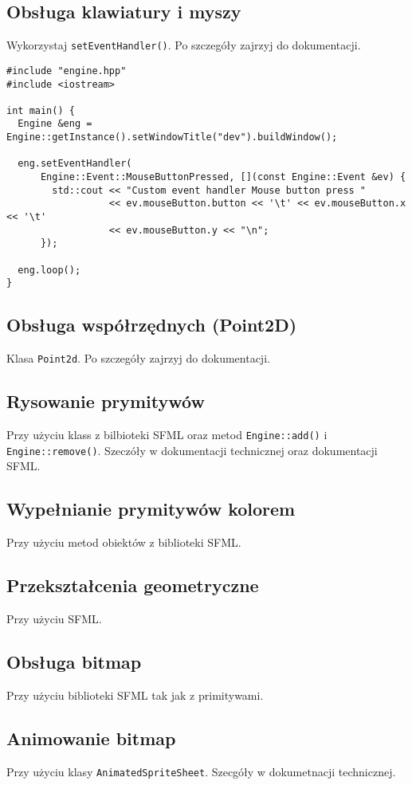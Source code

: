 \documentclass[11pt]{article}
\begin{document}
\subsection{Obsługa klawiatury i myszy}
\label{sec:org43269a6}
Wykorzystaj \texttt{setEventHandler()}. Po szczegóły zajrzyj do dokumentacji.

\begin{verbatim}
#include "engine.hpp"
#include <iostream>

int main() {
  Engine &eng = Engine::getInstance().setWindowTitle("dev").buildWindow();

  eng.setEventHandler(
      Engine::Event::MouseButtonPressed, [](const Engine::Event &ev) {
        std::cout << "Custom event handler Mouse button press "
                  << ev.mouseButton.button << '\t' << ev.mouseButton.x << '\t'
                  << ev.mouseButton.y << "\n";
      });

  eng.loop();
}
\end{verbatim}
\subsection{Obsługa współrzędnych (Point2D)}
\label{sec:org9666499}
Klasa \texttt{Point2d}. Po szczegóły zajrzyj do dokumentacji.
\subsection{Rysowanie prymitywów}
\label{sec:orgdeb4bf1}
Przy użyciu klass z bilbioteki SFML oraz metod \texttt{Engine::add()} i \texttt{Engine::remove()}.
Szeczóły w dokumentacji technicznej oraz dokumentacji SFML.
\subsection{Wypełnianie prymitywów kolorem}
\label{sec:orgfabc6a9}
Przy użyciu metod obiektów z biblioteki SFML.
\subsection{Przekształcenia geometryczne}
\label{sec:org52973b8}
Przy użyciu SFML.
\subsection{Obsługa bitmap}
\label{sec:org998f764}
Przy użyciu biblioteki SFML tak jak z primitywami.
\subsection{Animowanie bitmap}
\label{sec:orgd573061}
Przy użyciu klasy \texttt{AnimatedSpriteSheet}. Szecgóły w dokumetnacji technicznej.
\end{document}
